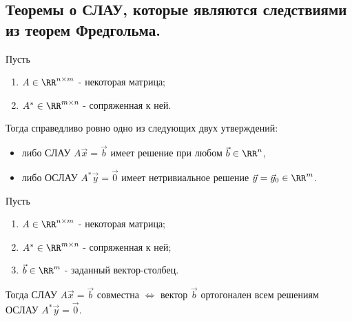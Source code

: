 \subsection{
    Теоремы о СЛАУ, которые являются следствиями из теорем Фредгольма.
}

\begin{theorem} Пусть 
    \begin{enumerate}
        \item $A \in \RR^{n \times m}$ - некоторая матрица;
        \item $A^* \in \RR^{m \times n}$ - сопряженная к ней.
    \end{enumerate}

    Тогда справедливо ровно одно из следующих двух утверждений:

    \begin{itemize}
        \item либо СЛАУ $A\vec{x} = \vec{b}$ имеет решение при любом $\vec{b} \in \RR^n$, 
        \item либо ОСЛАУ $A^*\vec{y} = \vec{0}$ имеет нетривиальное решение $\vec{y} = \vec{y}_0 \in \RR^m$.
    \end{itemize}
\end{theorem}

\begin{theorem} Пусть
    \begin{enumerate}
        \item $A \in \RR^{n \times m}$ - некоторая матрица;
        \item $A^* \in \RR^{m \times n}$ - сопряженная к ней;
        \item $\vec{b} \in \RR^{m}$ - заданный вектор-столбец.
    \end{enumerate}

    Тогда СЛАУ $A\vec{x} = \vec{b}$ совместна $\iff$ вектор $\vec{b}$ ортогонален всем решениям ОСЛАУ $A^*\vec{y} = \vec{0}$.
\end{theorem}
